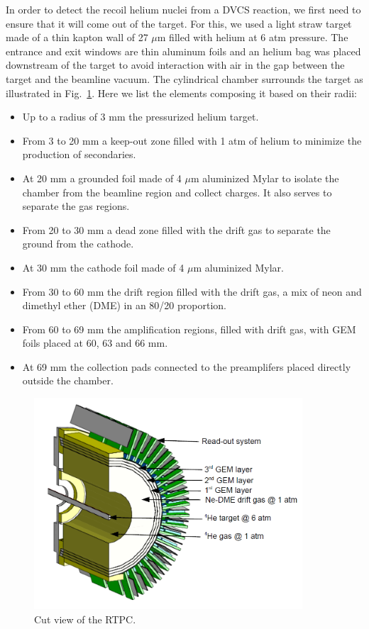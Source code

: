 \documentclass[aps,prc,preprint,superscriptaddress]{revtex4}
\begin{document}
In order to detect the recoil helium nuclei from a DVCS reaction, we first need 
to ensure that it will come out of the target. For this, we used a light straw 
target made of a thin kapton wall of 27 $\mu$m filled with helium at 6 atm 
pressure. The entrance and exit windows are thin aluminum foils and an helium 
bag was placed downstream of the target to avoid interaction with air in the gap 
between the target and the beamline vacuum. The cylindrical 
chamber surrounds the target as illustrated in Fig.~\ref{fig:RTPCGlobal}. Here we 
list the elements composing it based on their radii:
\begin{itemize}
	\item Up to a radius of 3 mm the pressurized helium target.
	\item From 3 to 20 mm a keep-out zone filled with 1 atm of helium to 
		minimize the production of secondaries. 
	\item At 20 mm a grounded foil made of 4 $\mu$m aluminized Mylar to 
		isolate the chamber from the beamline 
		region and collect charges. It also serves to separate the gas regions.
	\item From 20 to 30 mm a dead zone
		filled with the drift gas to separate the ground from the cathode.
	\item At 30 mm the cathode foil made of 4 $\mu$m aluminized Mylar.
	\item From 30 to 60 mm the drift region filled with the drift gas, a mix of 
                neon and dimethyl ether (DME) in an 80/20 proportion.
	\item From 60 to 69 mm the amplification regions, filled with drift gas, 
		with GEM foils placed at 60, 63 and 66 mm.
	\item At 69 mm the collection pads connected to the preamplifers placed 
		directly outside the chamber.
\end{itemize}

\begin{figure}[tbp!]
\center
\includegraphics[width=10cm]{RTPC_new_1.png}
\caption{Cut view of the RTPC.}
\label{fig:RTPCGlobal}
\end{figure}
\end{document}
